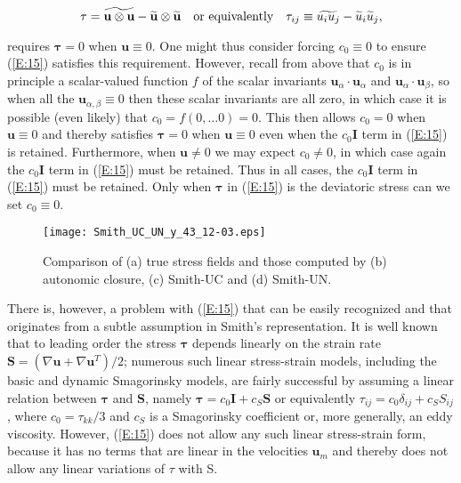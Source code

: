 %
\begin{equation}
\label{E:16}
	\mathbf{\tau} = \widetilde{\mathbf{u} \otimes \mathbf{u}} 
		 - \widetilde{\mathbf{u}} \otimes \widetilde{\mathbf{u}}
	\quad \textnormal{or equivalently} \quad
	\tau_{ij} \equiv \widetilde{u_i u_j} - \widetilde{u}_i \widetilde{u}_j,  
\end{equation}
%
%        

requires $\mathbf{\tau} = 0$  when $\mathbf{u} \equiv 0$. One might thus consider forcing $c_0 \equiv 0$  to ensure (\ref{E:15}) satisfies this requirement.  However, recall from above that $c_0$  is in principle a scalar-valued function $f$  of the scalar invariants  $\mathbf{u}_{\alpha} \cdot \mathbf{u}_{\alpha}$ and $\mathbf{u}_{\alpha} \cdot \mathbf{u}_{\beta}$, so when all the  $\mathbf{u}_{\alpha, \beta} \equiv 0$ then these scalar invariants are all zero, in which case it is possible (even likely) that $c_0 = f(0,\ldots0) = 0$.  This then allows $c_0 = 0$   when  $\mathbf{u} \equiv 0$ and thereby satisfies $\mathbf{\tau} = 0$  when  $\mathbf{u} \equiv 0$ even when the $c_0 \mathbf{I}$  term in (\ref{E:15}) is retained.  Furthermore, when $\mathbf{u} \neq 0$  we may expect $c_0 \neq 0$, in which case again the $c_0 \mathbf{I}$ term in (\ref{E:15}) must be retained.  Thus in all cases, the  $c_0 \mathbf{I}$ term in (\ref{E:15}) must be retained.  Only when  $\mathbf{\tau}$ in (\ref{E:15}) is the deviatoric stress can we set $c_0 \equiv 0$.



%
\begin{figure}
	\begin{center} \hspace{1.5cm}
	\texttt{[image: Smith\_UC\_UN\_y\_43\_12-03.eps]}
	\caption{Comparison of (a) true stress fields and those computed by (b) autonomic closure, (c) Smith-UC and (d) Smith-UN. }
	\label{F:Smith_UC}
	\end{center}
\end{figure}
%
%

There is, however, a problem with (\ref{E:15}) that can be easily recognized and that originates from a subtle assumption in Smith’s representation.  It is well known that to leading order the stress  $\mathbf{\tau}$ depends linearly on the strain rate $\mathbf{S} = (\nabla \mathbf{u} + \nabla \mathbf{u}^T)/2$; numerous such linear stress-strain models, including the basic and dynamic Smagorinsky models, are fairly successful by assuming a linear relation between $\mathbf{\tau}$  and $\mathbf{S}$, namely $\mathbf{\tau} = c_0\mathbf{I} + c_S \mathbf{S}$  or equivalently $\tau_{ij} = c_0\delta_{ij} + c_S S_{ij}$, where $c_0 = \tau_{kk}/3$  and $c_S$  is a Smagorinsky coefficient or, more generally, an eddy viscosity.  However, (\ref{E:15}) does not allow any such linear stress-strain form, because it has no terms that are linear in the velocities $\mathbf{u}_{m}$  and thereby does not allow any linear variations of $\tau$ with S.

